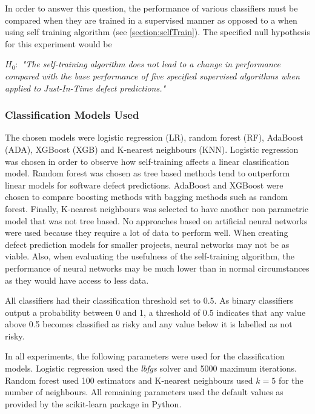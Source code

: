 \documentclass[../main.tex]{subfiles}
\begin{document}
In order to answer this question, the performance of various classifiers must be compared when they are trained in a supervised manner as opposed to a when using self training algorithm (see \ref{section:selfTrain}). The specified null hypothesis for this experiment would be 

\begin{center}
   \textit{$H_0:$ "The self-training algorithm does not lead to a change in performance compared with the base performance of five specified supervised algorithms when applied to Just-In-Time defect predictions."}
\end{center}


\subsubsection{Classification Models Used}

The chosen models were logistic regression (LR), random forest (RF), AdaBoost (ADA), XGBoost (XGB) and K-nearest neighbours (KNN). Logistic regression was chosen in order to observe how self-training affects a linear classification model. Random forest was chosen as tree based methods tend to outperform linear models for software defect predictions. AdaBoost and XGBoost were chosen to compare boosting methods with bagging methods such as random forest. Finally, K-nearest neighbours was selected to have another non parametric model that was not tree based. No approaches based on artificial neural networks were used 
because they require a lot of data to perform well. When creating defect prediction models for smaller projects, neural networks may not be as viable. Also, when evaluating the usefulness of the self-training algorithm, the performance of neural networks may be much lower than in normal circumstances as they would have access to less data.

All classifiers had their classification threshold set to 0.5. As binary classifiers output a probability between 0 and 1, a threshold of 0.5 indicates that any value above 0.5 becomes classified as risky and any value below it is labelled as not risky. 

In all experiments, the following parameters were used for the classification models. Logistic regression used the \textit{lbfgs} solver and 5000 maximum iterations. Random forest used 100 estimators and K-nearest neighbours used $k=5$ for the number of neighbours. All remaining parameters used the default values as provided by the scikit-learn package in Python. 
\end{document}
